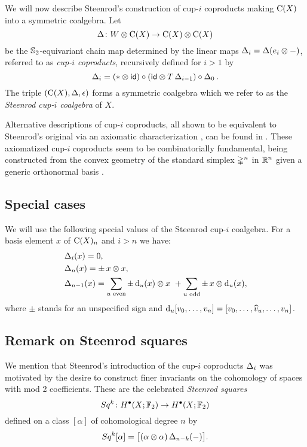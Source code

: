 We will now describe Steenrod's construction of cup-$i$ coproducts \cite[p.293]{steenrod1947products} making $\operatorname{C}(X)$ into a symmetric coalgebra.
Let
\[
\operatorname{\Delta} \colon W \otimes \operatorname{C}(X) \to \operatorname{C}(X) \otimes \operatorname{C}(X)
\]
be the $\mathbb{S}_2$-equivariant chain map determined by the linear maps $\operatorname{\Delta}_i = \operatorname{\Delta}(e_i \otimes -)$, referred to as \textit{cup-$i$ coproducts}, recursively defined for $i > 1$ by
\begin{equation*}\label{e:cup-i coproducts}
	\operatorname{\Delta}_i =
	(\ast \otimes \mathsf{id}) \circ (\mathsf{id} \otimes T\operatorname{\Delta}_{i-1}) \circ \operatorname{\Delta}_0.
\end{equation*}
The triple $(\operatorname{C}(X), \operatorname{\Delta}, \operatorname{\epsilon})$ forms a symmetric coalgebra which we refer to as the \textit{Steenrod cup-$i$ coalgebra} of $X$.

Alternative descriptions of cup-$i$ coproducts, all shown to be equivalent to Steenrod's original via an axiomatic characterization \cite{medina2022axiomatic}, can be found in \cite{real1996computability, gonzalez-diaz1999steenrod, mcclure2003multivariable, medina2021fast_sq}.
These axiomatized cup-$i$ coproducts seem to be combinatorially fundamental, being constructed from the convex geometry of the standard simplex $\mathbb{\Delta}^n$ in $\mathbb{R}^n$ given a generic orthonormal basis \cite{medina2022fib_poly}.

\subsection{Special cases}

We will use the following special values of the Steenrod cup-$i$ coalgebra.
For a basis element $x$ of $\operatorname{C}(X)_n$ and $i > n$ we have:
\begin{align}
	&\operatorname{\Delta}_i(x) = 0, \\
	&\operatorname{\Delta}_n(x) = \pm \, x \otimes x, \\
	&\operatorname{\Delta}_{n-1}(x) =
	\sum_{u \text{ even}} \pm \operatorname{d}_u(x) \otimes x \ +
	\sum_{u \text{ odd}} \pm \, x \otimes \operatorname{d}_u(x),
\end{align}
where $\pm$ stands for an unspecified sign and $\operatorname{d}_u [v_0,\dots,v_n] = [v_0,\dots,\widehat{v}_u,\dots,v_n]$.

\subsection{Remark on Steenrod squares}\label{ss:steenrod squares}

We mention that Steenrod's introduction of the cup-$i$ coproducts $\operatorname{\Delta}_i$ was motivated by the desire to construct finer invariants on the cohomology of spaces with mod 2 coefficients.
These are the celebrated \textit{Steenrod squares}
\[
Sq^k \colon H^\bullet(X; {\mathbb{F}_2}) \to H^\bullet(X; {\mathbb{F}_2})
\]
defined on a class $[\alpha]$ of cohomological degree $n$ by
\[
Sq^k [\alpha] = \big[ (\alpha \otimes \alpha) \operatorname{\Delta}_{n-k}(-) \big].
\]

